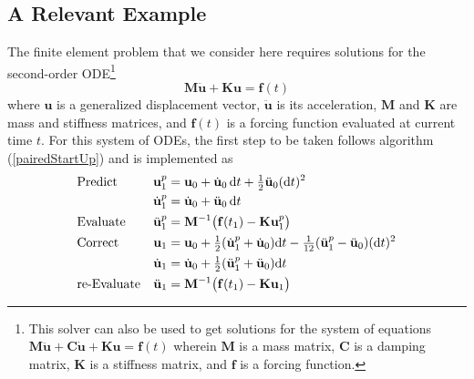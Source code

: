 \subsection{A Relevant Example}
\label{sec:solve2ndOrderODE}

The finite element problem that we consider here requires solutions for the second-order ODE\footnote{
    This solver can also be used to get solutions for the system of equations $\mathbf{M} \ddot{\mathbf{u}} + \mathbf{C} \dot{\mathbf{u}} + \mathbf{K} \mathbf{u} = \mathbf{f}(t)$ wherein $\mathbf{M}$ is a mass matrix, $\mathbf{C}$ is a damping matrix, $\mathbf{K}$ is a stiffness matrix, and $\mathbf{f}$ is a forcing function.
}
\begin{displaymath}
    \mathbf{M} \ddot{\mathbf{u}} + \mathbf{K}\mathbf{u} = \mathbf{f}(t)
\end{displaymath}
where $\mathbf{u}$ is a generalized displacement vector, $\ddot{\mathbf{u}}$ is its acceleration, $\mathbf{M}$ and $\mathbf{K}$ are mass and stiffness matrices, and $\mathbf{f}(t)$ is a forcing function evaluated at current time $t$.  For this system of ODEs, the first step to be taken follows algorithm (\ref{pairedStartUp}) and is implemented as
\begin{subequations}
    \notag
    \begin{align}
    \mbox{} & \text{Predict} & 
    \mathbf{u}_1^p & = \mathbf{u}_0 + \dot{\mathbf{u}}_0 \, \mathrm{d}t +
    \tfrac{1}{2} \ddot{\mathbf{u}}_0 ( \mathrm{d}t )^2 \\
    \mbox{} & &
    \dot{\mathbf{u}}^p_1 & = \dot{\mathbf{u}}_0 + \ddot{\mathbf{u}}_0 \, \mathrm{d}t \\
    \mbox{} & \text{Evaluate} &
    \ddot{\mathbf{u}}^p_1 & = \mathbf{M}^{-1} \bigl( \mathbf{f}(t_{1} ) - 
    \mathbf{K} \mathbf{u}_1^p \bigr) \\
    \mbox{} & \text{Correct} &
    \mathbf{u}_1 & = \mathbf{u}_0 + \tfrac{1}{2} 
    ( \dot{\mathbf{u}}^p_1 + \dot{\mathbf{u}}_0 ) \mathrm{d}t -
    \tfrac{1}{12} ( \ddot{\mathbf{u}}^p_1 - \ddot{\mathbf{u}}_0 ) 
    ( \mathrm{d}t )^2 \\
    \mbox{} & &
    \dot{\mathbf{u}}_1 & = \dot{\mathbf{u}}_0 + \tfrac{1}{2}  
    ( \ddot{\mathbf{u}}_1^p + \ddot{\mathbf{u}}_0 ) \mathrm{d}t \\
    \mbox{} & \text{re-Evaluate} &
    \ddot{\mathbf{u}}_1 & = \mathbf{M}^{-1} \bigl( \mathbf{f}(t_1 ) - 
    \mathbf{K} \mathbf{u}_1 \bigr)
    \end{align}
\end{subequations}
